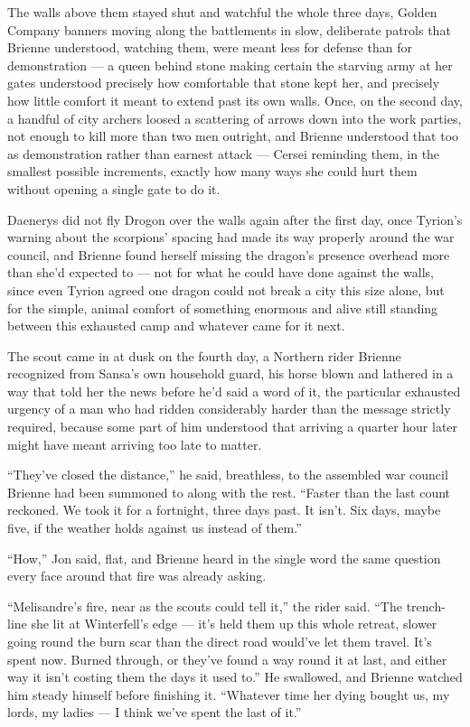 The walls above them stayed shut and watchful the whole three days, Golden Company banners moving along the battlements in slow, deliberate patrols that Brienne understood, watching them, were meant less for defense than for demonstration — a queen behind stone making certain the starving army at her gates understood precisely how comfortable that stone kept her, and precisely how little comfort it meant to extend past its own walls. Once, on the second day, a handful of city archers loosed a scattering of arrows down into the work parties, not enough to kill more than two men outright, and Brienne understood that too as demonstration rather than earnest attack — Cersei reminding them, in the smallest possible increments, exactly how many ways she could hurt them without opening a single gate to do it.

Daenerys did not fly Drogon over the walls again after the first day, once Tyrion’s warning about the scorpions’ spacing had made its way properly around the war council, and Brienne found herself missing the dragon’s presence overhead more than she’d expected to — not for what he could have done against the walls, since even Tyrion agreed one dragon could not break a city this size alone, but for the simple, animal comfort of something enormous and alive still standing between this exhausted camp and whatever came for it next.

\sceneBreak

The scout came in at dusk on the fourth day, a Northern rider Brienne recognized from Sansa’s own household guard, his horse blown and lathered in a way that told her the news before he’d said a word of it, the particular exhausted urgency of a man who had ridden considerably harder than the message strictly required, because some part of him understood that arriving a quarter hour later might have meant arriving too late to matter.

“They’ve closed the distance,” he said, breathless, to the assembled war council Brienne had been summoned to along with the rest. “Faster than the last count reckoned. We took it for a fortnight, three days past. It isn’t. Six days, maybe five, if the weather holds against us instead of them.”

“How,” Jon said, flat, and Brienne heard in the single word the same question every face around that fire was already asking.

“Melisandre’s fire, near as the scouts could tell it,” the rider said. “The trench-line she lit at Winterfell’s edge — it’s held them up this whole retreat, slower going round the burn scar than the direct road would’ve let them travel. It’s spent now. Burned through, or they’ve found a way round it at last, and either way it isn’t costing them the days it used to.” He swallowed, and Brienne watched him steady himself before finishing it. “Whatever time her dying bought us, my lords, my ladies — I think we’ve spent the last of it.”

